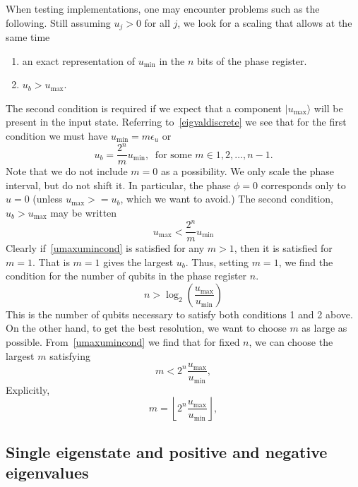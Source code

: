 \documentclass[superscriptaddress,nofootinbib,longbibliography,aps,pre]{revtex4-1}
\newcommand{\ket}[1]{|{#1}\rangle}
\newcommand{\umax}{u_{\text{max}}}
\newcommand{\umin}{u_{\text{min}}}
\begin{document}
When testing implementations, one may encounter problems such as the following.
Still assuming $u_{j}>0$ for all $j$, we look for a scaling that allows at the same time
%
\begin{enumerate}
   \item{an exact representation of $\umin$ in the $n$ bits of the phase register.}
   \item{$u_{b} > \umax$}.
\end{enumerate}
%
The second condition is required if we expect that a component $\ket{\umax}$ will be present in the input state.
Referring to~\eqref{eigvaldiscrete} we see that for the first condition we must have $\umin = m\epsilon_{u}$ or
%
\begin{equation}
  u_{b} = \frac{2^{n}}{m} \umin, \ \text{ for some } m \in {1,2,\ldots, n-1}.
\end{equation}
%
Note that we do not include $m=0$ as a possibility.
We only scale the phase interval, but do not shift it.
In particular, the phase $\phi=0$ corresponds only to $u=0$
(unless $\umax >= u_{b}$, which we want to avoid.)
The second condition, $u_{b} > \umax$ may be written
%
\begin{equation}
  \label{umaxumincond}
  \umax < \frac{2^{n}}{m} \umin
\end{equation}
%
Clearly if~\eqref{umaxumincond} is satisfied for any $m>1$, then it
is satisfied for $m=1$.
That is $m=1$ gives the largest $u_{b}$.
Thus, setting $m=1$, we find the condition for the number of qubits in the phase register $n$.
%
\begin{equation}
  n > \log_{2}\left(\frac{\umax}{\umin} \right)
\end{equation}
%
This is the number of qubits necessary to satisfy both conditions 1 and 2 above.
On the other hand, to get the best resolution, we want to choose $m$ as large
as possible. From~\eqref{umaxumincond} we find that for fixed $n$, we can
choose the largest $m$ satisfying
%
\begin{equation}
  m < 2^{n}\frac{\umax}{\umin},
\end{equation}
%
Explicitly,
%
\begin{equation}
  m =  \left \lfloor{2^{n}\frac{\umax}{\umin}} \right \rfloor,
\end{equation}
%

\subsection{Single eigenstate and positive and negative eigenvalues}
\end{document}
